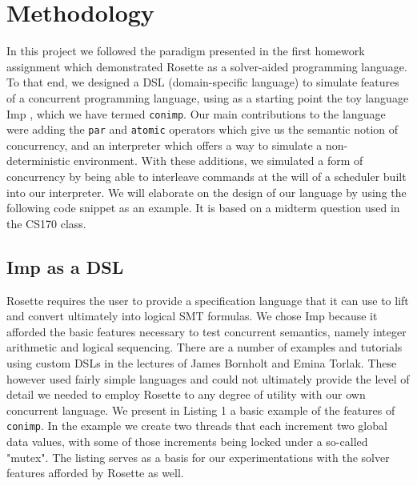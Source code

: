 \section{Methodology}
In this project we followed the paradigm presented in the first homework assignment which demonstrated Rosette as a solver-aided programming language.  To that end, we designed a DSL (domain-specific language) to simulate features of a concurrent programming language, using as a starting point the toy language Imp \cite{winskel1993}, which we have termed \texttt{conimp}. Our main contributions to the language were adding the \texttt{par} and \texttt{atomic} operators which give us the semantic notion of concurrency, and an interpreter which offers a way to simulate a non-deterministic environment.  With these additions, we simulated a form of concurrency by being able to interleave commands at the will of a scheduler built into our interpreter.  We will elaborate on the design of our language by using the following code snippet as an example.  It is based on a midterm question used in the CS170 class.

\subsection{Imp as a DSL}
Rosette requires the user to provide a specification language that it can use to lift and convert ultimately into logical SMT formulas.  We chose Imp because it afforded the basic features necessary to test concurrent semantics, namely integer arithmetic and logical sequencing.  There are a number of examples and tutorials using custom DSLs  in the lectures of James Bornholt and Emina Torlak.  These however used fairly simple languages and could not ultimately provide the level of detail we needed to employ Rosette to any degree of utility with our own concurrent language.  We present in Listing 1 a basic example of the features of \texttt{conimp}.  In the example we create two threads that each increment two global data values, with some of those increments being locked under a so-called "mutex".  The listing serves as a basis for our experimentations with the solver features afforded by Rosette as well.

